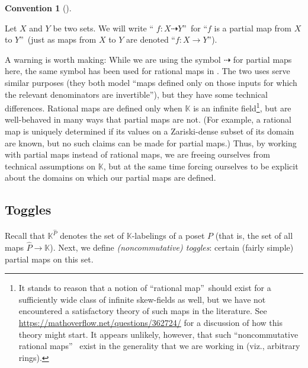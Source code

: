 \documentclass[numbers=enddot,12pt,final,onecolumn,notitlepage]{scrartcl}%
\theoremstyle{definition}
\newtheorem{conv}[theo]{Convention}
\newenvironment{convention}[1][]
{\begin{conv}[#1]\begin{leftbar}}
{\end{leftbar}\end{conv}}
\begin{document}
\begin{convention}
Let $X$ and $Y$ be two sets. We will write \textquotedblleft%
$f:X\dashrightarrow Y$\textquotedblright\ for \textquotedblleft$f$ is a
partial map from $X$ to $Y$\textquotedblright\ (just as maps from $X$ to $Y$
are denoted \textquotedblleft$f:X\rightarrow Y$\textquotedblright).
\end{convention}



A warning is worth making: While we are using the symbol $\dashrightarrow$ for
partial maps here, the same symbol has been used for rational maps in
\cite{bir-row-arxiv}. The two uses serve similar purposes (they both model
\textquotedblleft maps defined only on those inputs for which the relevant
denominators are invertible\textquotedblright), but they have some technical
differences. Rational maps are defined only when $\mathbb{K}$ is an infinite
field\footnote{It stands to reason that a notion of \textquotedblleft rational
map\textquotedblright\ should exist for a sufficiently wide class of infinite
skew-fields as well, but we have not encountered a satisfactory theory of such
maps in the literature. See \url{https://mathoverflow.net/questions/362724/}
for a discussion of how this theory might start. It appears unlikely, however,
that such \textquotedblleft noncommutative rational maps\textquotedblright%
\ exist in the generality that we are working in (viz., arbitrary rings).},
but are well-behaved in many ways that partial maps are not. (For example, a
rational map is uniquely determined if its values on a Zariski-dense subset of
its domain are known, but no such claims can be made for partial maps.) Thus,
by working with partial maps instead of rational maps, we are freeing
ourselves from technical assumptions on $\mathbb{K}$, but at the same time
forcing ourselves to be explicit about the domains on which our partial maps
are defined.

\subsection{Toggles}

Recall that $\mathbb{K}^{\widehat{P}}$ denotes the set of $\mathbb{K}%
$-labelings of a poset $P$ (that is, the set of all maps $\widehat{P}%
\rightarrow\mathbb{K}$). Next, we define \emph{(noncommutative) toggles}:
certain (fairly simple) partial maps on this set.
\end{document}
